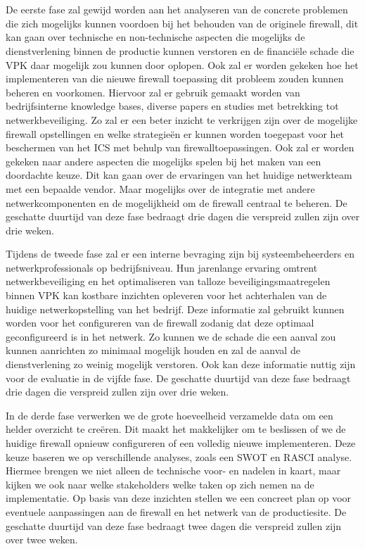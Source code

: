 \chapter{}%
\label{ch:methodologie}

De eerste fase zal gewijd worden aan het analyseren van de concrete problemen die zich mogelijks kunnen voordoen bij het behouden van de originele firewall, dit kan gaan over technische en non-technische aspecten die mogelijks de dienstverlening binnen de productie kunnen verstoren en de financiële schade die VPK daar mogelijk zou kunnen door oplopen. Ook zal er worden gekeken hoe het implementeren van die nieuwe firewall toepassing dit probleem zouden kunnen beheren en voorkomen. Hiervoor zal er gebruik gemaakt worden van bedrijfsinterne knowledge bases, diverse papers en studies met betrekking tot netwerkbeveiliging. Zo zal er een beter inzicht te verkrijgen zijn over de mogelijke firewall opstellingen en welke strategieën er kunnen worden toegepast voor het beschermen van het ICS met behulp van firewalltoepassingen. Ook zal er worden gekeken naar andere aspecten die mogelijks spelen bij het maken van een doordachte keuze. Dit kan gaan over de ervaringen van het huidige netwerkteam met een bepaalde vendor. Maar mogelijks over de integratie met andere netwerkcomponenten en de mogelijkheid om de firewall centraal te beheren. De geschatte duurtijd van deze fase bedraagt drie dagen die verspreid zullen zijn over drie weken.


Tijdens de tweede fase zal er een interne bevraging zijn bij systeembeheerders en netwerkprofessionals op bedrijfsniveau. Hun jarenlange ervaring omtrent netwerkbeveiliging en het optimaliseren van talloze beveiligingsmaatregelen binnen VPK kan kostbare inzichten opleveren voor het achterhalen van de huidige netwerkopstelling van het bedrijf. Deze informatie zal gebruikt kunnen worden voor het configureren van de firewall zodanig dat deze optimaal geconfigureerd is in het netwerk. Zo kunnen we de schade die een aanval zou kunnen aanrichten zo minimaal mogelijk houden en zal de aanval de dienstverlening zo weinig mogelijk verstoren. Ook kan deze informatie nuttig zijn voor de evaluatie in de vijfde fase. De geschatte duurtijd van deze fase bedraagt drie dagen die verspreid zullen zijn over drie weken.

In de derde fase verwerken we de grote hoeveelheid verzamelde data om een helder overzicht te creëren. Dit maakt het makkelijker om te beslissen of we de huidige firewall opnieuw configureren of een volledig nieuwe implementeren. Deze keuze baseren we op verschillende analyses, zoals een SWOT en RASCI analyse. Hiermee brengen we niet alleen de technische voor- en nadelen in kaart, maar kijken we ook naar welke stakeholders welke taken op zich nemen na de implementatie. Op basis van deze inzichten stellen we een concreet plan op voor eventuele aanpassingen aan de firewall en het netwerk van de productiesite. De geschatte duurtijd van deze fase bedraagt twee dagen die verspreid zullen zijn over twee weken.

